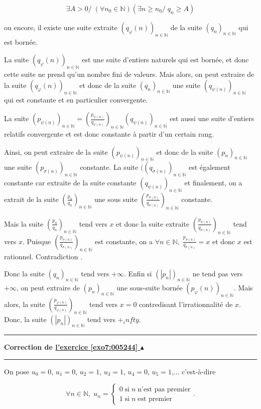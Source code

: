 \documentclass[11pt,a4paper]{article}
\newcommand{\Nn}{\mathbb{N}} \newcommand{\N}{\mathbb{N}}
\newcounter{exo}
\newcommand{\correction}[1]{\hypertarget{cor7:#1}{}\label{cor7:#1}{\bf Correction de \hyperlink{exo7:#1}{l'exercice \ref{exo7:#1} $\blacktriangle$}}\vspace{1mm}\hrule\vspace{1mm}}
\newcommand{\fincorrection}{\vspace{1mm}\hrule\vspace*{7mm}}
\begin{document}
$$\exists A>0/\;(\forall n_0\in\Nn)(\exists n\geq n_0/\;q_n\geq A)$$ 

ou encore, il existe une suite extraite $(q_{\varphi}(n))_{n\in\Nn}$ de la suite $(q_n)_{n\in\Nn}$ qui est bornée.

La suite $(q_{\varphi}(n))_{n\in\Nn}$ est une suite d'entiers naturels qui est bornée, et donc cette suite ne prend qu'un nombre fini de valeurs. Mais alors, on peut extraire de la suite $(q_{\varphi}(n))_{n\in\Nn}$ et donc de la suite $(q_n)_{n\in\Nn}$ une suite $(q_{\psi(n)})_{n\in\Nn}$ qui est constante et en particulier convergente.

La suite $(p_{\psi(n)})_{n\in\Nn}=(\frac{p_{\psi(n)}}{q_{\psi(n)}})_{n\in\Nn}(q_{\psi(n)})_{n\in\Nn}$ est aussi une suite d'entiers relatifs convergente et est donc constante à partir d'un certain rang.

Ainsi, on peut extraire de la suite $(p_{\psi(n)})_{n\in\Nn}$ et donc de la suite $(p_n)_{n\in\Nn}$ une suite $(p_{\sigma(n)})_{n\in\Nn}$ constante.
La suite $((q_{\sigma(n)})_{n\in\Nn}$ est également constante car extraite de la suite constante $(q_{\psi(n)})_{n\in\Nn}$ et finalement, on a extrait de la suite $(\frac{p_n}{q_n})_{n\in\Nn}$  une sous suite $(\frac{p_{\sigma(n)}}{q_{\sigma(n)}})_{n\in\Nn}$ constante.

Mais la suite $(\frac{p_n}{q_n})_{n\in\Nn}$ tend vers $x$ et donc la suite extraite $(\frac{p_{\sigma(n)}}{q_{\sigma(n)}})_{n\in\Nn}$ tend vers $x$. Puisque $(\frac{p_{\sigma(n)}}{q_{\sigma(n)}})_{n\in\Nn}$ est constante, on a $\forall n\in\Nn,\;\frac{p_{\sigma(n)}}{q_{\sigma(n)}}=x$ et donc $x$ est rationnel. Contradiction .

Donc la suite $(q_n)_{n\in\Nn}$ tend vers $+\infty$. Enfin si $(|p_n|)_{n\in\Nn}$ ne tend pas vers $+\infty$, on peut extraire de $(p_n)_{n\in\Nn}$ une sous-suite bornée $(p_{\varphi}(n))_{n\in\Nn}$. Mais alors, la suite $(\frac{p_{\varphi(n)}}{q_{\varphi(n)}})_{n\in\Nn}$ tend vers $x=0$ contredisant l'irrationnalité de $x$. Donc, la suite $(|p_n|)_{n\in\Nn}$ tend vers $+_infty$.
\fincorrection
\correction{005244}
On pose $u_0=0$, $u_1=0$, $u_2=1$, $u_3=1$, $u_4=0$, $u_5=1$,... c'est-à-dire 

$$\forall n\in\Nn,\;u_n=\left\{
\begin{array}{l}
0\;\mbox{si}\;n\;\mbox{n'est pas premier}\\
1\;\mbox{si}\;n\;\mbox{est premier}
\end{array}
\right..$$
 
\end{document}
